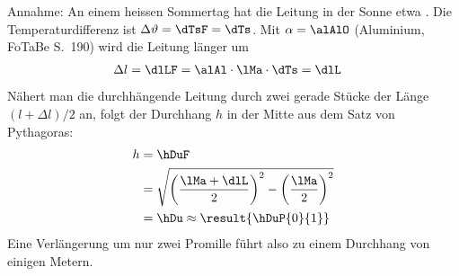 \begin{center}
\end{center}

Annahme: An einem heissen Sommertag hat die Leitung in der Sonne etwa \THeO. Die Temperaturdifferenz ist $\Delta\vartheta = \dTsF = \dTs$. Mit $\alpha = \alAlO$ (Aluminium, FoTaBe S.~190) wird die Leitung länger um
\begin{align}
 \Delta l &= \dlLF = \alAl\cdot\lMa\cdot\dTs = \dlL
\end{align}
Nähert man die durchhängende Leitung durch zwei gerade Stücke der Länge $(l+\Delta l)/2$ an, folgt der Durchhang $h$ in der Mitte aus dem Satz von Pythagoras:
\begin{align}
 h &= \hDuF \\
   &= \sqrt{\left(\frac{\lMa+\dlL}{2}\right)^2-\left(\frac{\lMa}{2}\right)^2} \\
   &= \hDu \approx \result{\hDuP{0}{1}}
\end{align}
Eine Verlängerung um nur zwei Promille führt also zu einem Durchhang von einigen Metern.
